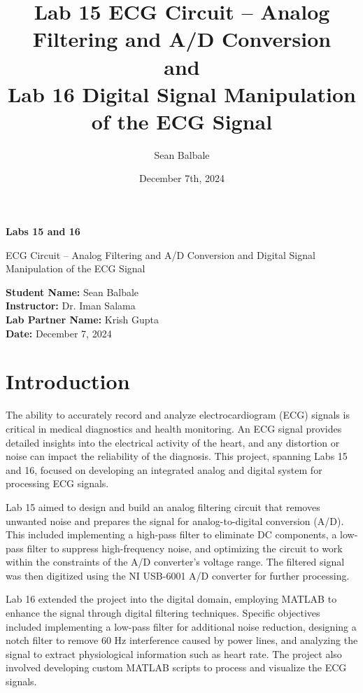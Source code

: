 \documentclass[11pt]{article}
\title{Lab 15 ECG Circuit – Analog Filtering and A/D Conversion\\
  and\\
  Lab 16 Digital Signal Manipulation of the ECG Signal
}
\author{Sean Balbale}
\date{December 7th, 2024}
\begin{document}
\begin{titlepage}
  \begin{center}
    \vspace*{1in}

    \Huge
    \textbf{Labs 15 and 16}

    \LARGE
    ECG Circuit – Analog Filtering and A/D Conversion and Digital Signal Manipulation of the ECG Signal

    \vspace{3in}

    \textbf{Student Name:} Sean Balbale
    \\ \textbf{Instructor:} Dr. Iman Salama
    \\ \textbf{Lab Partner Name:} Krish Gupta
    \\ \textbf{Date:} December 7, 2024

    \vfill

  \end{center}
\end{titlepage}

\newpage

\section{Introduction}
The ability to accurately record and analyze electrocardiogram (ECG) signals is critical in medical diagnostics and
health monitoring. An ECG signal provides detailed insights into the electrical activity of the heart, and any distortion
or noise can impact the reliability of the diagnosis. This project, spanning Labs 15 and 16, focused on developing an
integrated analog and digital system for processing ECG signals.

Lab 15 aimed to design and build an analog filtering circuit that removes unwanted noise and prepares the signal for
analog-to-digital conversion (A/D). This included implementing a high-pass filter to eliminate DC components, a low-pass
filter to suppress high-frequency noise, and optimizing the circuit to work within the constraints of the A/D converter’s
voltage range. The filtered signal was then digitized using the NI USB-6001 A/D converter for further processing.

Lab 16 extended the project into the digital domain, employing MATLAB to enhance the signal through digital filtering
techniques. Specific objectives included implementing a low-pass filter for additional noise reduction, designing a
notch filter to remove 60 Hz interference caused by power lines, and analyzing the signal to extract physiological
information such as heart rate. The project also involved developing custom MATLAB scripts to process and visualize
the ECG signals.
\end{document}
